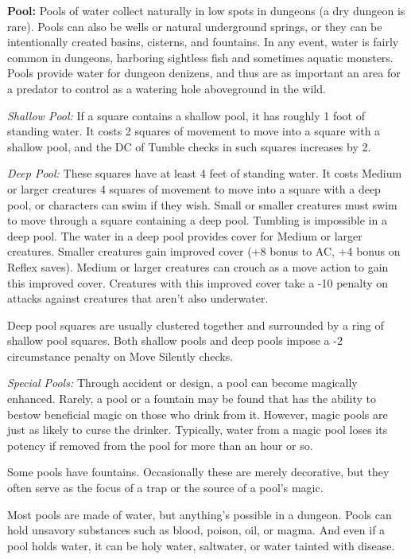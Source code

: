 \textbf{Pool:} Pools of water collect naturally in low spots in dungeons (a dry dungeon is rare). Pools can also be wells or natural underground springs, or they can be intentionally created basins, cisterns, and fountains. In any event, water is fairly common in dungeons, harboring sightless fish and sometimes aquatic monsters. Pools provide water for dungeon denizens, and thus are as important an area for a predator to control as a watering hole aboveground in the wild.

\textit{Shallow Pool:} If a square contains a shallow pool, it has roughly 1 foot of standing water. It costs 2 squares of movement to move into a square with a shallow pool, and the DC of Tumble checks in such squares increases by 2.

\textit{Deep Pool:} These squares have at least 4 feet of standing water. It costs Medium or larger creatures 4 squares of movement to move into a square with a deep pool, or characters can swim if they wish. Small or smaller creatures must swim to move through a square containing a deep pool. Tumbling is impossible in a deep pool. The water in a deep pool provides cover for Medium or larger creatures. Smaller creatures gain improved cover (+8 bonus to AC, +4 bonus on Reflex saves). Medium or larger creatures can crouch as a move action to gain this improved cover. Creatures with this improved cover take a -10 penalty on attacks against creatures that aren't also underwater. 

Deep pool squares are usually clustered together and surrounded by a ring of shallow pool squares. Both shallow pools and deep pools impose a -2 circumstance penalty on Move Silently checks.

\textit{Special Pools:} Through accident or design, a pool can become magically enhanced. Rarely, a pool or a fountain may be found that has the ability to bestow beneficial magic on those who drink from it. However, magic pools are just as likely to curse the drinker. Typically, water from a magic pool loses its potency if removed from the pool for more than an hour or so.

Some pools have fountains. Occasionally these are merely decorative, but they often serve as the focus of a trap or the source of a pool's magic.

Most pools are made of water, but anything's possible in a dungeon. Pools can hold unsavory substances such as blood, poison, oil, or magma. And even if a pool holds water, it can be holy water, saltwater, or water tainted with disease.

